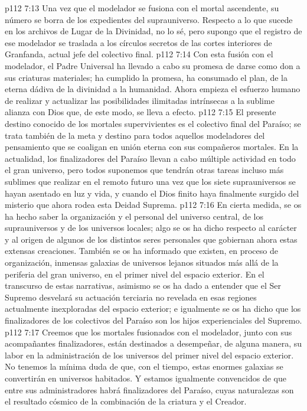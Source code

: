 \vs p112 7:13 Una vez que el modelador se fusiona con el mortal ascendente, su número se borra de los expedientes del suprauniverso. Respecto a lo que sucede en los archivos de Lugar de la Divinidad, no lo sé, pero supongo que el registro de ese modelador se traslada a los círculos secretos de las cortes interiores de Granfanda, actual jefe del colectivo final.
\vs p112 7:14 Con esta fusión con el modelador, el Padre Universal ha llevado a cabo su promesa de darse como don a sus criaturas materiales; ha cumplido la promesa, ha consumado el plan, de la eterna dádiva de la divinidad a la humanidad. Ahora empieza el esfuerzo humano de realizar y actualizar las posibilidades ilimitadas intrínsecas a la sublime alianza con Dios que, de este modo, se lleva a efecto.
\vs p112 7:15 \pc El presente destino conocido de los mortales supervivientes es el colectivo final del Paraíso; se trata también de la meta y destino para todos aquellos modeladores del pensamiento que se coaligan en unión eterna con sus compañeros mortales. En la actualidad, los finalizadores del Paraíso llevan a cabo múltiple actividad en todo el gran universo, pero todos suponemos que tendrán otras tareas incluso más sublimes que realizar en el remoto futuro una vez que los siete suprauniversos se hayan asentado en luz y vida, y cuando el Dios finito haya finalmente surgido del misterio que ahora rodea esta Deidad Suprema.
\vs p112 7:16 En cierta medida, se os ha hecho saber la organización y el personal del universo central, de los suprauniversos y de los universos locales; algo se os ha dicho respecto al carácter y al origen de algunos de los distintos seres personales que gobiernan ahora estas extensas creaciones. También se os ha informado que existen, en proceso de organización, inmensas galaxias de universos lejanos situados más allá de la periferia del gran universo, en el primer nivel del espacio exterior. En el transcurso de estas narrativas, asimismo se os ha dado a entender que el Ser Supremo desvelará su actuación terciaria no revelada en esas regiones actualmente inexploradas del espacio exterior; e igualmente se os ha dicho que los finalizadores de los colectivos del Paraíso son los hijos experienciales del Supremo.
\vs p112 7:17 Creemos que los mortales fusionados con el modelador, junto con sus acompañantes finalizadores, están destinados a desempeñar, de alguna manera, su labor en la administración de los universos del primer nivel del espacio exterior. No tenemos la mínima duda de que, con el tiempo, estas enormes galaxias se convertirán en universos habitados. Y estamos igualmente convencidos de que entre sus administradores habrá finalizadores del Paraíso, cuyas naturalezas son el resultado cósmico de la combinación de la criatura y el Creador.
